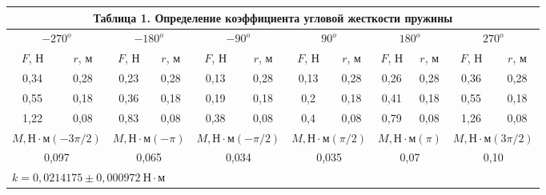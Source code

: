 \documentclass[a4paper,14pt]{article}
\begin{document}
    \begin{center}
        \begin{tabular}{|llllllllllll|}
            \multicolumn{12}{c}{Таблица 1. Определение коэффициента угловой жесткости пружины} \bigstrut[b]\\
            \hline
            \multicolumn{2}{|c|}{\(-270^{o}\)} & \multicolumn{2}{c|}{\(-180^{o}\)} & \multicolumn{2}{c|}{\(-90^{o}\)} & \multicolumn{2}{c|}{\(90^{o}\)} & \multicolumn{2}{c|}{\(180^{o}\)} & \multicolumn{2}{c|}{\(270^{o}\)} \bigstrut\\
            \hline
            \multicolumn{1}{|c|}{\(F\), Н} & \multicolumn{1}{c|}{\(r\), м} & \multicolumn{1}{|c|}{\(F\), Н} & \multicolumn{1}{c|}{\(r\), м} & \multicolumn{1}{|c|}{\(F\), Н} & \multicolumn{1}{c|}{\(r\), м} & \multicolumn{1}{|c|}{\(F\), Н} & \multicolumn{1}{c|}{\(r\), м} & \multicolumn{1}{|c|}{\(F\), Н} & \multicolumn{1}{c|}{\(r\), м} & \multicolumn{1}{|c|}{\(F\), Н} & \multicolumn{1}{c|}{\(r\), м} \bigstrut\\
            \hline
            \multicolumn{1}{|c|}{0,34} & \multicolumn{1}{c|}{0,28} & \multicolumn{1}{c|}{0,23} & \multicolumn{1}{c|}{0,28} & \multicolumn{1}{c|}{0,13} & \multicolumn{1}{c|}{0,28} & \multicolumn{1}{c|}{0,13} & \multicolumn{1}{c|}{0,28} & \multicolumn{1}{c|}{0,26} & \multicolumn{1}{c|}{0,28} & \multicolumn{1}{c|}{0,36} & \multicolumn{1}{c|}{0,28} \bigstrut\\
            \hline
            \multicolumn{1}{|c|}{0,55} & \multicolumn{1}{c|}{0,18} & \multicolumn{1}{c|}{0,36} & \multicolumn{1}{c|}{0,18} & \multicolumn{1}{c|}{0,19} & \multicolumn{1}{c|}{0,18} & \multicolumn{1}{c|}{0,2} & \multicolumn{1}{c|}{0,18} & \multicolumn{1}{c|}{0,41} & \multicolumn{1}{c|}{0,18} & \multicolumn{1}{c|}{0,55} & \multicolumn{1}{c|}{0,18} \bigstrut\\
            \hline
            \multicolumn{1}{|c|}{1,22} & \multicolumn{1}{c|}{0,08} & \multicolumn{1}{c|}{0,83} & \multicolumn{1}{c|}{0,08} & \multicolumn{1}{c|}{0,38} & \multicolumn{1}{c|}{0,08} & \multicolumn{1}{c|}{0,4} & \multicolumn{1}{c|}{0,08} & \multicolumn{1}{c|}{0,79} & \multicolumn{1}{c|}{0,08} & \multicolumn{1}{c|}{1,26} & \multicolumn{1}{c|}{0,08} \bigstrut\\
            \hline
            \multicolumn{2}{|c|}{\(M, \text{Н}\cdot\text{м} (-3\pi/2) \)} & \multicolumn{2}{c|}{\(M, \text{Н}\cdot\text{м} (-\pi) \)} & \multicolumn{2}{c|}{\(M, \text{Н}\cdot\text{м} (-\pi/2) \)} & \multicolumn{2}{c|}{\(M, \text{Н}\cdot\text{м} (\pi/2) \)} & \multicolumn{2}{c|}{\(M, \text{Н}\cdot\text{м} (\pi) \)} & \multicolumn{2}{c|}{\(M, \text{Н}\cdot\text{м} (3\pi/2) \)} \bigstrut\\
            \hline
            \multicolumn{2}{|c|}{0,097} & \multicolumn{2}{c|}{0,065} & \multicolumn{2}{c|}{0,034} & \multicolumn{2}{c|}{0,035} & \multicolumn{2}{c|}{0,07} & \multicolumn{2}{c|}{0,10} \bigstrut\\
            \hline
            \multicolumn{12}{|l|}{\(k = 0,0214175 \pm 0,000972 \ \text{Н}\cdot\text{м} \)} \bigstrut\\
            \hline
        \end{tabular}%
    \end{center}
\end{document}
